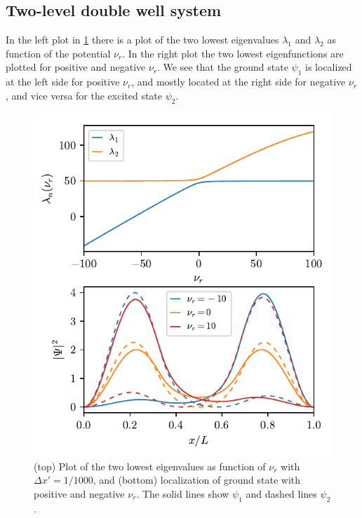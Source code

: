 \subsection*{Two-level double well system}

In the left plot in \cref{fig:detuning1} there is a plot of the two lowest eigenvalues $\lambda_1$ and $\lambda_2$ as function of the potential $\nu_r$. In the right plot the two lowest eigenfunctions are plotted for positive and negative $\nu_r$. We see that the ground state $\psi_1$ is localized at the left side for positive $\nu_r$, and mostly located at the right side for negative $\nu_r$, and vice versa for the excited state $\psi_2$.
\begin{figure}[ht!]%
\centering%
\includegraphics{figs/task4.pdf}%
\caption{(top) Plot of the two lowest eigenvalues as function of $\nu_r$ with $\Delta x' = 1/1000$, and (bottom) localization of ground state with positive and negative $\nu_r$. The solid lines show $\psi_1$ and dashed lines $\psi_2$. \label{fig:detuning1}}%
\end{figure}